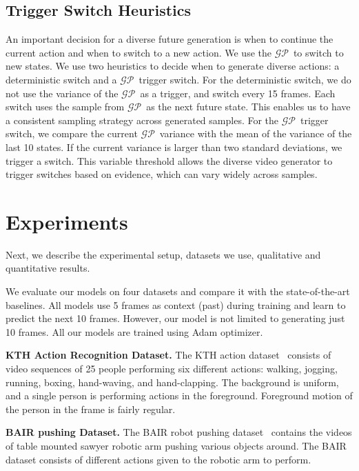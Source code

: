 \documentclass{article} \usepackage{iclr2021_conference,times}
\newcommand{\GP}{$\mathcal{GP}$}
\begin{document}
\vspace{-0.05in}
\subsection{Trigger Switch Heuristics}
\vspace{-0.05in}
An important decision for a diverse future generation is when to continue the current action and when to switch to a new action. We use the \GP\ to switch to new states. We use two heuristics to decide when to generate diverse actions: a deterministic switch and a \GP\ trigger switch. For the deterministic switch, we do not use the variance of the \GP\ as a trigger,  and switch every 15 frames. Each switch uses the sample from \GP\ as the next future state. This enables us to have a consistent sampling strategy across generated samples. For the \GP\ trigger switch, we compare the current \GP\ variance with the mean of the variance of the last 10 states. If the current variance is larger than two standard deviations, we trigger a switch. 
This variable threshold allows the diverse video generator to trigger switches based on evidence, which can vary widely across samples.

\section{Experiments}
\label{sec:exps}
Next, we describe the experimental setup, datasets we use, qualitative and quantitative results.

We evaluate our models on four datasets and compare it with the state-of-the-art baselines. All models use 5 frames as context (past) during training and learn to predict the next 10 frames. However, our model is not limited to generating just 10 frames. All our models are trained using Adam optimizer.



\noindent\textbf{KTH Action Recognition Dataset.} The KTH action dataset~\citep{1334462} consists of video sequences of 25 people performing six different actions: walking, jogging, running, boxing, hand-waving, and hand-clapping. The background is uniform, and a single person is performing actions in the foreground. Foreground motion of the person in the frame is fairly regular. 


\noindent\textbf{BAIR pushing Dataset.} The BAIR robot pushing dataset~\citep{ebert2017selfsupervised} contains the videos of table mounted sawyer robotic arm pushing various objects around. The BAIR dataset consists of different actions given to the robotic arm to perform. 
\end{document}
